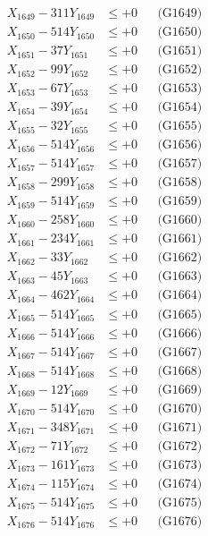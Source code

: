 \documentclass[a4paper,10pt]{article}
\begin{document}
{\begin{align}
X_{1649} - 311Y_{1649} &\leq +0 && \text{(G1649)} \\
X_{1650} - 514Y_{1650} &\leq +0 && \text{(G1650)} \\
\allowbreak
X_{1651} - 37Y_{1651} &\leq +0 && \text{(G1651)} \\
X_{1652} - 99Y_{1652} &\leq +0 && \text{(G1652)} \\
X_{1653} - 67Y_{1653} &\leq +0 && \text{(G1653)} \\
X_{1654} - 39Y_{1654} &\leq +0 && \text{(G1654)} \\
X_{1655} - 32Y_{1655} &\leq +0 && \text{(G1655)} \\
X_{1656} - 514Y_{1656} &\leq +0 && \text{(G1656)} \\
X_{1657} - 514Y_{1657} &\leq +0 && \text{(G1657)} \\
X_{1658} - 299Y_{1658} &\leq +0 && \text{(G1658)} \\
X_{1659} - 514Y_{1659} &\leq +0 && \text{(G1659)} \\
X_{1660} - 258Y_{1660} &\leq +0 && \text{(G1660)} \\
\allowbreak
X_{1661} - 234Y_{1661} &\leq +0 && \text{(G1661)} \\
X_{1662} - 33Y_{1662} &\leq +0 && \text{(G1662)} \\
X_{1663} - 45Y_{1663} &\leq +0 && \text{(G1663)} \\
X_{1664} - 462Y_{1664} &\leq +0 && \text{(G1664)} \\
X_{1665} - 514Y_{1665} &\leq +0 && \text{(G1665)} \\
X_{1666} - 514Y_{1666} &\leq +0 && \text{(G1666)} \\
X_{1667} - 514Y_{1667} &\leq +0 && \text{(G1667)} \\
X_{1668} - 514Y_{1668} &\leq +0 && \text{(G1668)} \\
X_{1669} - 12Y_{1669} &\leq +0 && \text{(G1669)} \\
X_{1670} - 514Y_{1670} &\leq +0 && \text{(G1670)} \\
\allowbreak
X_{1671} - 348Y_{1671} &\leq +0 && \text{(G1671)} \\
X_{1672} - 71Y_{1672} &\leq +0 && \text{(G1672)} \\
X_{1673} - 161Y_{1673} &\leq +0 && \text{(G1673)} \\
X_{1674} - 115Y_{1674} &\leq +0 && \text{(G1674)} \\
X_{1675} - 514Y_{1675} &\leq +0 && \text{(G1675)} \\
X_{1676} - 514Y_{1676} &\leq +0 && \text{(G1676)} \\

\end{align}}
\end{document}
